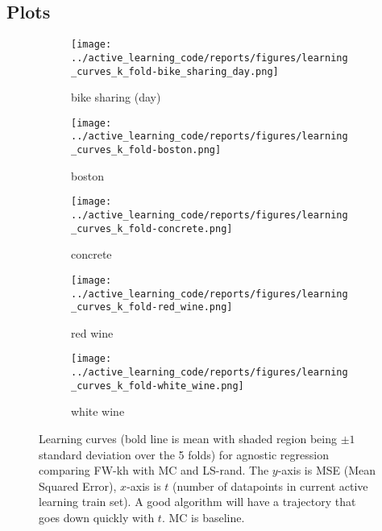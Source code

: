 \subsection{Plots}
\begin{figure}[htb]
  \label{figs:agnostic-regression-learning-curves}
  \centering
  \begin{subfigure}[b]{0.48\textwidth}
    \label{fig:learning-curve-agnostic-bike-sharing}
    \texttt{[image: ../active\_learning\_code/reports/figures/learning\_curves\_k\_fold-bike\_sharing\_day.png]}
    \caption{bike sharing (day)}
  \end{subfigure}
  \begin{subfigure}[b]{0.48\textwidth}
    \label{fig:learning-curve-agnostic-boston}
    \texttt{[image: ../active\_learning\_code/reports/figures/learning\_curves\_k\_fold-boston.png]}
    \caption{boston}
  \end{subfigure}
  \hspace{1.0cm}
  \begin{subfigure}[b]{0.48\textwidth}
    \label{fig:learning-curve-agnostic-concrete}
    \texttt{[image: ../active\_learning\_code/reports/figures/learning\_curves\_k\_fold-concrete.png]}
    \caption{concrete}
  \end{subfigure}
  \begin{subfigure}[b]{0.48\textwidth}
    \label{fig:learning-curve-agnostic-red_whine}
    \texttt{[image: ../active\_learning\_code/reports/figures/learning\_curves\_k\_fold-red\_wine.png]}
    \caption{red wine}
  \end{subfigure}
  \hspace{1.0cm}
  \begin{subfigure}[b]{0.48\textwidth}
    \label{fig:learning-curve-agnostic-white_wine}
    \texttt{[image: ../active\_learning\_code/reports/figures/learning\_curves\_k\_fold-white\_wine.png]}
    \caption{white wine}
  \end{subfigure}
  \caption{Learning curves (bold line is mean with shaded region being \(\pm 1\) standard deviation over the 5 folds) for agnostic regression comparing FW-kh with MC and
    LS-rand. The \(y\)-axis is MSE (Mean Squared Error), \(x\)-axis is \(t\)
    (number of datapoints in current active learning train set). A good
    algorithm will have a trajectory that goes down quickly with \(t\). MC is baseline.}
\end{figure}

